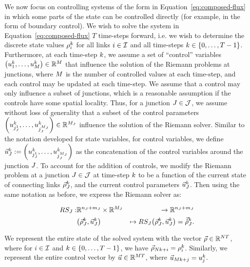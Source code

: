 We now focus on controlling systems of the form
in Equation~\eqref{eq:composed-flux} in which some parts of the state
can be controlled directly (for example, in the form of boundary control).
We wish to solve the system in Equation~\eqref{eq:composed-flux} $T$
time-steps forward, i.e. we wish to determine the discrete state values
$\rho_{i}^{k}$ for all links $i\in\mathcal{I}$ and all
time-steps $\tind\in\intrange 0{\ntime-1}$. Furthermore, at each
time-step $k$, we assume a set of ``control'' variables $\tuple{\condiscrete 1{\tind}}{\condiscrete{\ncontrols}{\tind}}\in\mathbb{R}^{\ncontrols}$
that influence the solution of the Riemann problems at junctions,
where $M$ is the number of controlled values at each time-step,
and each control may be updated at each time-step. We assume that
a control may only influence a subset of junctions, which is a reasonable
assumption if the controls have some spatial locality. Thus, for a
junction $J\in\mathcal{J}$, we assume without loss of generality that
a subset of the control parameters $\tuple{\condiscrete{\cind_{\jn}^{1}}{\tind}}{\condiscrete{\cind_{\jn}^{\ncontrols_{\jn}}}{\tind}}\in\mathbb{R}^{\ncontrols_{\jn}}$
influence the solution of the Riemann solver. Similar to the notation
developed for state variables, for control variables, we define $\junccon{\jn}{\tind}\defeq\tuple{\condiscrete{\cind_{\jn}^{1}}{\tind}}{\condiscrete{\cind_{\jn}^{\ncontrols_{\jn}}}{\tind}}$
as the concatenation of the control variables around the junction
$J$. To account for the addition of controls, we modify the Riemann
problem at a junction $J\in\mathcal{J}$ at time-step $k$ to be a
function of the current state of connecting links $\vec{\rho}_{J}^{k}$,
and the current control parameters $\vec{u}_{J}^{k}$. Then using
the same notation as before, we express the Riemann solver as:

\begin{eqnarray*}
	\RS_{\jn}: & \mathbb{R}^{\ninc_{\jn}+\nout_{\jn}}\times\mathbb{R}^{\ncontrols_{\jn}} & \rightarrow\mathbb{R}^{\ninc_{\jn}+\nout_{\jn}}\\
	& \left(\juncstate{\jn}{\tind},\junccon{\jn}{\tind}\right) & \mapsto\RS_{\jn}\left(\juncstate{\jn}{\tind},\junccon{\jn}{\tind}\right)=\junctrace{\jn}{\tind}.
\end{eqnarray*}


We represent the entire state of the solved system with the vector
$\vec{\rho}\in\mathbb{R}^{NT}$, where for $i\in\mathcal{I}$
and $k\in\intrange 0{\ntime-1}$, we have $\vec{\rho}_{N k+i}=\rho_{i}^{k}$.
Similarly, we represent the entire control vector by $\vec{u}\in\mathbb{R}^{MT}$,
where $\vec{u}_{Mk+j}=u_{j}^{k}$.

